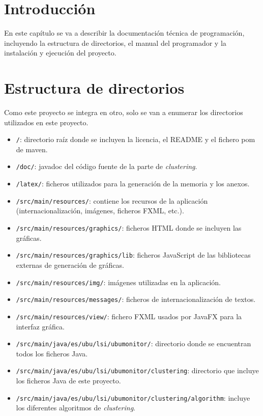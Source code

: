 
\section{Introducción}
En este capítulo se va a describir la documentación técnica de programación, incluyendo la estructura de directorios, el manual del programador y la instalación y ejecución del proyecto.

\section{Estructura de directorios}
Como este proyecto se integra en otro, solo se van a enumerar los directorios utilizados en este proyecto.

\begin{itemize}
	\item \texttt{/}: directorio raíz donde se incluyen la licencia, el README y el fichero pom de maven.
	\item \texttt{/doc/}: javadoc del código fuente de la parte de \emph{clustering}.
	\item \texttt{/latex/}: ficheros utilizados para la generación de la memoria y los anexos.
	\item \texttt{/src/main/resources/}: contiene los recursos de la aplicación (internacionalización, imágenes, ficheros FXML, etc.).
	\item \texttt{/src/main/resources/graphics/}: ficheros HTML donde se incluyen las gráficas.
	\item \texttt{/src/main/resources/graphics/lib}: ficheros JavaScript de las bibliotecas externas de generación de gráficas.
	\item \texttt{/src/main/resources/img/}: imágenes utilizadas en la aplicación.
	\item \texttt{/src/main/resources/messages/}: ficheros de internacionalización de textos.
	\item \texttt{/src/main/resources/view/}: fichero FXML usados por JavaFX para la interfaz gráfica.
	\item \texttt{/src/main/java/es/ubu/lsi/ubumonitor/}: directorio donde se encuentran todos los ficheros Java.
	\item \texttt{/src/main/java/es/ubu/lsi/ubumonitor/clustering}: directorio que incluye los ficheros Java de este proyecto.
	\item \texttt{/src/main/java/es/ubu/lsi/ubumonitor/clustering/algorithm}: incluye los diferentes algoritmos de \emph{clustering}.

\end{itemize}
